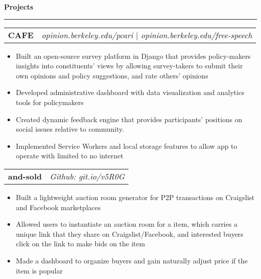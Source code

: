 \documentclass[11pt,letterpaper]{article}
\makeatletter
\newenvironment{topic}[1]
    {
    {\Large \centerline{#1}}
    \vspace*{0.03in}
    \hrule 
    \vspace*{0.05in}
    }
    {}
\newenvironment{event}
    {
    \begin{tabular*}{\textwidth}{l@{\extracolsep{\fill}}r}
    }
    {
    \end{tabular*}
    }
\makeatother
\begin{document}
    \begin{topic}{\textbf{Projects}}
        \begin{event}
            \textbf{CAFE} & \emph{opinion.berkeley.edu/pcari $\vert$ opinion.berkeley.edu/free-speech}
        \end{event}
            \begin{itemize}
                \item Built an open-source survey platform in Django that provides policy-makers insights into constituents' views by allowing survey-takers to submit their own opinions and policy suggestions, and rate others' opinions
                \item Developed administrative dashboard with data visualization and analytics tools for policymakers
                \item Created dynamic feedback engine that provides participants' positions on social issues relative to community.
                \item Implemented Service Workers and local storage features to allow app to operate with limited to no internet
            \end{itemize}

        \begin{event}
        \textbf{and-sold} & \emph{Github: git.io/v5R0G}
        \end{event}
            \begin{itemize}
                \item Built a lightweight auction room generator for P2P transactions on Craigslist and Facebook marketplaces
                \item Allowed users to instantiate an auction room for a item, which carries a unique link that they share on Craigslist/Facebook, and interested buyers click on the link to make bids on the item 
                \item Made a dashboard to organize buyers and gain naturally adjust price if the item is popular
            \end{itemize}



\end{topic}
\end{document}
